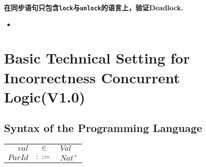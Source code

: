 \documentclass[UTF8, 8pt, a4paper ]{ctexart}
\newcommand{\circline}{
	\mathrel{%
		\raisebox{0.15mm}{
		\begin{tikzpicture}
			\draw[line width=0.35pt] (0,0) circle (2pt);
			\draw[line width=0.35pt] (-1.2mm, 0)--(1.2mm, 0);
		\end{tikzpicture}\ }
	}
}
\begin{document}
	\fontsize{8pt}{8pt}
	\setlength{\baselineskip}{14pt}
	
	
	
\begin{small}
		
	
	




\textbf{在同步语句只包含\texttt{lock}与\texttt{unlock}的语言上，验证Deadlock.}
	\begin{itemize}
		\item 
	\end{itemize}
	
	\pagebreak

	\section{Basic Technical Setting for Incorrectness Concurrent Logic(V1.0)}
	
	\newcommand{\auxFuncs}{\mathcal{F}_\textsf{aux}}
	
	\subsection{Syntax of the Programming Language}
	
		\begin{longtable}{rcl}
			\hline
				$ val $ & $ \in $ & $ \textit{Val} $ \\
				
				$ParId$ & $ ::= $ & $\textit{Nat}^{+}$ \\


\end{longtable}
\end{small}
\end{document}
